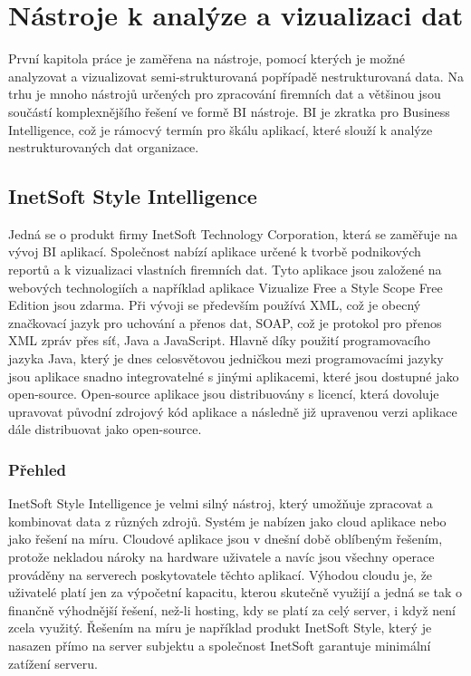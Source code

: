 \documentclass[czech,BP]{thesiskiv}
\begin{document}
\chapter{Nástroje k analýze a vizualizaci dat }
\label{Nástroje_1}
První kapitola práce je zaměřena na nástroje, pomocí kterých je možné analyzovat a vizualizovat semi-strukturovaná popřípadě nestrukturovaná data. Na trhu je mnoho nástrojů určených pro zpracování firemních dat a většinou jsou součástí komplexnějšího řešení ve formě BI nástroje. BI je zkratka pro Business Intelligence, což je rámocvý termín pro škálu aplikací, které slouží k analýze nestrukturovaných dat organizace.\cite{BI}

\section{InetSoft Style Intelligence}
Jedná se o produkt firmy InetSoft Technology Corporation, která  se zaměřuje na vývoj BI aplikací. Společnost nabízí aplikace určené k tvorbě podnikových reportů a k vizualizaci vlastních firemních dat. Tyto aplikace jsou založené na webových technologiích a například aplikace Vizualize Free a Style Scope Free Edition jsou zdarma. Při vývoji se především používá XML, což je obecný značkovací jazyk pro uchování a přenos dat, SOAP, což je protokol pro přenos XML zpráv přes síť, Java a JavaScript\cite{InetTechnology}. Hlavně díky použití programovacího jazyka Java, který je dnes celosvětovou jedničkou mezi programovacími jazyky \cite{JavaStandings} jsou aplikace snadno integrovatelné s jinými aplikacemi, které jsou dostupné jako open-source. Open-source aplikace jsou distribuovány s licencí, která dovoluje upravovat původní zdrojový kód aplikace a následně již upravenou verzi aplikace dále distribuovat jako open-source.

\subsection{Přehled}
InetSoft Style Intelligence je velmi silný nástroj, který umožňuje zpracovat a kombinovat data z různých zdrojů. Systém je nabízen jako cloud aplikace nebo jako řešení na míru. Cloudové aplikace jsou v dnešní době oblíbeným řešením, protože nekladou nároky na hardware uživatele a navíc jsou všechny operace prováděny na serverech poskytovatele těchto aplikací. Výhodou cloudu je, že uživatelé platí jen za výpočetní kapacitu, kterou skutečně využijí a jedná se tak o finančně výhodnější řešení, než-li hosting, kdy se platí za celý server, i když není zcela využitý. Řešením na míru je například produkt InetSoft Style, který je nasazen přímo na server subjektu a společnost InetSoft garantuje minimální zatížení serveru.
\end{document}
